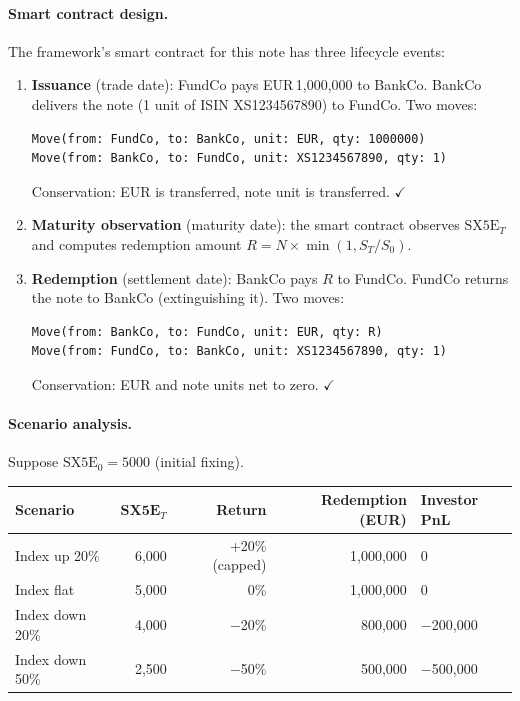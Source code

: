 \documentclass[11pt,a4paper]{article}
\begin{document}
\paragraph{Smart contract design.}

The framework's smart contract for this note has three lifecycle events:

\begin{enumerate}[nosep]
\item \textbf{Issuance} (trade date): FundCo pays EUR\,1,000,000 to BankCo. BankCo delivers the note (1 unit of ISIN XS1234567890) to FundCo. Two moves:

\begin{lstlisting}
Move(from: FundCo, to: BankCo, unit: EUR, qty: 1000000)
Move(from: BankCo, to: FundCo, unit: XS1234567890, qty: 1)
\end{lstlisting}

Conservation: EUR is transferred, note unit is transferred. $\checkmark$

\item \textbf{Maturity observation} (maturity date): the smart contract observes $\text{SX5E}_T$ and computes redemption amount $R = N \times \min(1, S_T/S_0)$.

\item \textbf{Redemption} (settlement date): BankCo pays $R$ to FundCo. FundCo returns the note to BankCo (extinguishing it). Two moves:

\begin{lstlisting}
Move(from: BankCo, to: FundCo, unit: EUR, qty: R)
Move(from: FundCo, to: BankCo, unit: XS1234567890, qty: 1)
\end{lstlisting}

Conservation: EUR and note units net to zero. $\checkmark$
\end{enumerate}

\paragraph{Scenario analysis.} Suppose $\text{SX5E}_0 = 5000$ (initial fixing).

\begin{center}
\small
\begin{tabular}{@{}lrrrl@{}}
\toprule
\textbf{Scenario} & $\textbf{SX5E}_T$ & \textbf{Return} & \textbf{Redemption (EUR)} & \textbf{Investor PnL} \\
\midrule
Index up 20\% & 6,000 & +20\% (capped) & 1,000,000 & 0 \\
Index flat & 5,000 & 0\% & 1,000,000 & 0 \\
Index down 20\% & 4,000 & $-$20\% & 800,000 & $-$200,000 \\
Index down 50\% & 2,500 & $-$50\% & 500,000 & $-$500,000 \\
\bottomrule
\end{tabular}
\end{center}
\end{document}
